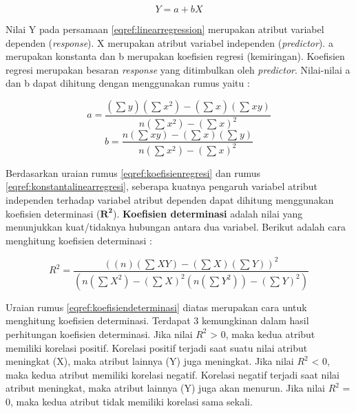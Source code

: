 \documentclass[a4paper,twoside]{article}
\begin{document}
\begin{enumerate}
		\begin{equation}
		 Y = a + bX
		\label{eqref:linearregression}
		\end{equation}
		
Nilai Y pada persamaan \eqref{eqref:linearregression} merupakan atribut variabel dependen (\textit{response}). X merupakan atribut variabel independen (\textit{predictor}). a merupakan konstanta dan b merupakan koefisien regresi (kemiringan). Koefisien regresi merupakan besaran \textit{response} yang ditimbulkan oleh \textit{predictor}. Nilai-nilai a dan b dapat dihitung dengan menggunakan rumus yaitu : 
		
		\begin{equation}
		 a = \frac{(\sum_{}^{} y)(\sum_{}^{} x^2) - (\sum_{}^{} x)(\sum{}^{} xy)}{n(\sum{}^{} x^2)-(\sum{}^{} x)^2}   
		 \label{eqref:konstantalinearregresi}
		\end{equation}
		\begin{equation}
		b = \frac{n(\sum{}^{} xy)-(\sum{}^{} x)(\sum{}^{} y)}{n(\sum{}^{} x^2)-(\sum{}^{} x)^2}
		\label{eqref:koefisienregresi}
		\end{equation}
		
Berdasarkan uraian rumus \eqref{eqref:koefisienregresi} dan rumus \eqref{eqref:konstantalinearregresi}, seberapa kuatnya pengaruh variabel atribut independen terhadap variabel  atribut dependen dapat dihitung menggunakan koefisien determinasi ($\mathbf{R^2}$). \textbf{Koefisien determinasi} adalah nilai yang menunjukkan kuat/tidaknya hubungan antara dua variabel. Berikut adalah cara menghitung koefisien determinasi : 
		
		\begin{equation}
		R^2 = \frac{((n)(\sum{}^{}XY)-(\sum{}^{}X)(\sum{}^{}Y))^2}{(n(\sum{}^{}X^2)-(\sum{}^{}X)^2(n(\sum{}^{}Y^2))-(\sum{}^{}Y)^2)}
		\label{eqref:koefisiendeterminasi}		
		\end{equation}
		
Uraian rumus \eqref{eqref:koefisiendeterminasi} diatas merupakan cara untuk menghitung koefisien determinasi. Terdapat 3 kemungkinan dalam hasil perhitungan koefisien determinasi. Jika nilai \textit{$R^2$} > 0, maka kedua atribut memiliki korelasi positif. Korelasi positif  terjadi saat suatu nilai atribut meningkat (X), maka atribut lainnya (Y) juga meningkat. Jika nilai \textit{$R^2$} < 0, maka kedua atribut memiliki korelasi negatif. Korelasi negatif terjadi saat  nilai atribut meningkat, maka atribut lainnya (Y) juga akan menurun. Jika nilai \textit{$R^2$} = 0, maka kedua atribut tidak memiliki korelasi sama sekali. 


\end{enumerate}
\end{document}
